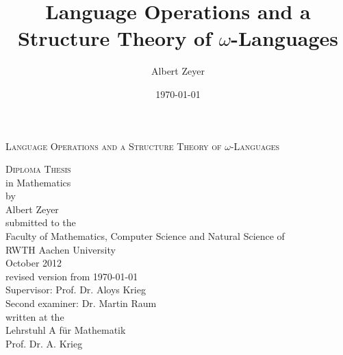 \documentclass[twoside,openright]{article}
\begin{document}
\title{Language Operations and a Structure Theory of $\omega$-Languages}
\author{Albert Zeyer}
\date{\today}

\begin{titlepage}
\begin{center}
\setlength{\parskip}{2ex plus0.5ex minus0.2ex}
\setlength{\baselineskip}{5ex}
\textsc{\LARGE Language Operations and a Structure Theory of $\omega$-Languages}\\[1.5cm]

\setlength{\baselineskip}{3ex}

\textsc{Diploma Thesis} \\
in Mathematics \\[0.7cm]

by \\
Albert Zeyer \\[3cm]

submitted to the \\
Faculty of Mathematics, Computer Science and Natural Science of \\
RWTH Aachen University \\[1.5cm]

October 2012 \\
revised version from \today \\[1.5cm]

Supervisor: Prof. Dr. Aloys Krieg \\
Second examiner: Dr. Martin Raum \\[1.5cm]

written at the \\
Lehrstuhl A für Mathematik \\
Prof. Dr. A. Krieg

\end{center}
\end{titlepage}


%
%
%
%
\end{document}
